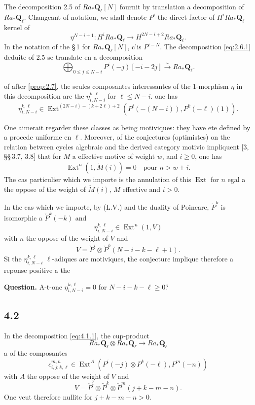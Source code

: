 \documentclass[11pt,a4paper]{article}
\theoremstyle{plain}
\theoremstyle{definition}
\DeclareMathOperator{\Ext}{Ext}
\newcommand{\bQ}{\mathbf{Q}}
\begin{document}
The decomposition 2.5 of $Ra_* \bQ_\ell[N]$ fournit by translation a decomposition of $Ra_* \bQ_\ell$. Changeant of notation, we shall denote $P^i$ the direct factor of $H^i Ra_* \bQ_\ell$ kernel of
\[
\eta^{N-i+1} \colon H^i Ra_* \bQ_\ell \to H^{2N-i+2} Ra_* \bQ_\ell.
\]
In the notation of the \S\,1 for $Ra_* \bQ_\ell[N]$, c'is $P^{i-N}$. The decomposition \eqref{eq:2.6.1} deduite of 2.5 se translate en a decomposition
\begin{equation}\label{eq:4.1.1}
\bigoplus_{0 \leqslant j \leqslant N-i} P^i(-j)[-i-2j] \xrightarrow{\sim} Ra_* \bQ_\ell.
\end{equation}

of after \ref{prop:2.7}, the seules composantes interessantes of the $1$-morphism $\eta$ in this decomposition are the $\eta^{k,\ell}_{i,N-i}$ for $\ell \leqslant N-i$. one has
\[
\eta^{k,\ell}_{i,N-i} \in \Ext^{(2N-i)-(k+2\ell)+2}(P^i(-(N-i)), P^k(-\ell)(1)).
\]

One aimerait regarder these classes as being motiviques: they have ete defined by a procede uniforme en $\ell$. Moreover, of the conjectures (optimistes) on the relation between cycles algebraic and the derived category motivic impliquent [3, \S\S\,3.7, 3.8] that for $M$ a effective motive of weight $w$, and $i \geqslant 0$, one has
\[
\Ext^n(1, \check{M}(i)) = 0 \quad \text{pour } n > w+i.
\]
The cas particulier which we importe is the annulation of this $\Ext$ for $n$ egal a the oppose of the weight of $\check{M}(i)$, $M$ effective and $i > 0$.

In the cas which we importe, by (L.V.) and the duality of Poincare, $\check{P}^k$ is isomorphic a $\check{P}^k(-k)$ and
\[
\eta^{k,\ell}_{i,N-i} \in \Ext^n(1, V)
\]
with $n$ the oppose of the weight of $V$ and
\[
V = \check{P}^i \otimes \check{P}^k(N-i-k-\ell+1).
\]
Si the $\eta^{k,\ell}_{i,N-i}$ $\ell$-adiques are motiviques, the conjecture implique therefore a reponse positive a the

\smallskip
\noindent\textbf{Question.} A-t-one $\eta^{k,\ell}_{i,N-i} = 0$ for $N-i-k-\ell \geqslant 0$?
\smallskip

\subsection*{4.2}
In the decomposition \eqref{eq:4.1.1}, the cup-product
\[
Ra_* \bQ_\ell \otimes Ra_* \bQ_\ell \to Ra_* \bQ_\ell
\]
a of the composantes
\[
c^{m,n}_{i,j;k,\ell} \in \Ext^A(P^i(-j) \otimes P^k(-\ell), P^m(-n))
\]
with $A$ the oppose of the weight of $V$ and
\[
V = \check{P}^i \otimes \check{P}^k \otimes \check{P}^m(j+k-m-n).
\]
One veut therefore nullite for $j+k-m-n > 0$.
\end{document}

